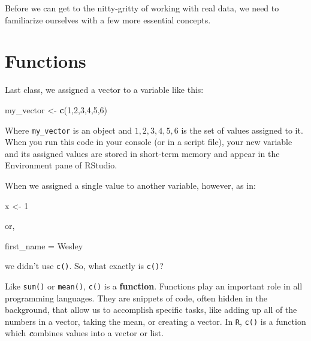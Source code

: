 \documentclass[
]{book}
\newenvironment{Shaded}{\begin{snugshade}}{\end{snugshade}}
\newcommand{\DecValTok}[1]{\textcolor[rgb]{0.00,0.00,0.81}{#1}}
\newcommand{\FunctionTok}[1]{\textcolor[rgb]{0.13,0.29,0.53}{\textbf{#1}}}
\newcommand{\NormalTok}[1]{#1}
\newcommand{\OtherTok}[1]{\textcolor[rgb]{0.56,0.35,0.01}{#1}}
\newcommand{\StringTok}[1]{\textcolor[rgb]{0.31,0.60,0.02}{#1}}
\begin{document}
Before we can get to the nitty-gritty of working with real data, we need to familiarize ourselves with a few more essential concepts.

\hypertarget{functions}{%
\section{Functions}\label{functions}}

Last class, we assigned a vector to a variable like this:

\begin{Shaded}
\begin{Highlighting}[]
\NormalTok{my\_vector }\OtherTok{\textless{}{-}} \FunctionTok{c}\NormalTok{(}\DecValTok{1}\NormalTok{,}\DecValTok{2}\NormalTok{,}\DecValTok{3}\NormalTok{,}\DecValTok{4}\NormalTok{,}\DecValTok{5}\NormalTok{,}\DecValTok{6}\NormalTok{)}
\end{Highlighting}
\end{Shaded}

Where \texttt{my\_vector} is an object and \({1,2,3,4,5,6}\) is the set of values assigned to it. When you run this code in your console (or in a script file), your new variable and its assigned values are stored in short-term memory and appear in the Environment pane of RStudio.

When we assigned a single value to another variable, however, as in:

\begin{Shaded}
\begin{Highlighting}[]
\NormalTok{x }\OtherTok{\textless{}{-}} \DecValTok{1}
\end{Highlighting}
\end{Shaded}

or,

\begin{Shaded}
\begin{Highlighting}[]
\NormalTok{first\_name }\OtherTok{=} \StringTok{\textquotesingle{}Wesley\textquotesingle{}}
\end{Highlighting}
\end{Shaded}

we didn't use \texttt{c()}. So, what exactly is \texttt{c()}?

Like \texttt{sum()} or \texttt{mean()}, \texttt{c()} is a \textbf{function}. Functions play an important role in all programming languages. They are snippets of code, often hidden in the background, that allow us to accomplish specific tasks, like adding up all of the numbers in a vector, taking the mean, or creating a vector. In \texttt{R}, \texttt{c()} is a function which \textbf{\emph{c}}ombines values into a vector or list.
\end{document}
